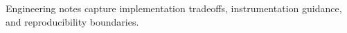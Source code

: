 Engineering notes capture implementation tradeoffs, instrumentation guidance, and reproducibility boundaries.
